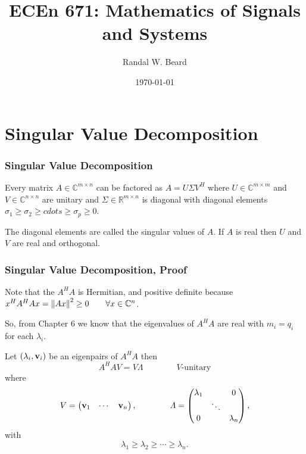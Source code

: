 \documentclass{beamer}
\title{ECEn 671: Mathematics of Signals and Systems}
\author{Randal W. Beard}
\institute{Brigham Young University}
\date{\today}
\begin{document}
\begin{frame}
	\titlepage
\end{frame}

\section{Singular Value Decomposition}
\frame{\sectionpage}


\begin{frame}\frametitle{Singular Value Decomposition}
	\begin{theorem}
		Every matrix $A \in \mathbb{C}^{m\times n}$ can be factored as $A = U\Sigma V^H$ where $U \in \mathbb{C}^{m\times m}$ and $V \in \mathbb{C}^{n\times n}$ are unitary and $\Sigma \in \mathbb{R}^{m\times n}$ is diagonal with diagonal elements $\sigma_1 \geq \sigma_2 \geq cdots \geq \sigma_p \geq 0$.
	\end{theorem}
	
	\vfill
		
	The diagonal elements are called the singular values of $A$.  If $A$ is real then $U$ and $V$ are real and orthogonal.
\end{frame}

\begin{frame}\frametitle{Singular Value Decomposition, Proof}
	Note that the $A^HA$ is Hermitian, and positive definite because $x^HA^HAx = \left\|Ax \right\|^2 \geq 0 \qquad \forall x\in\mathbb{C}^n$.
	
	\vfill
	
	So, from Chapter 6 we know that the eigenvalues of $A^HA$ are real with $m_i = q_i$ for each $\lambda_i$.  
	
	\vfill
	
	Let $(\lambda_i,\mathbf{v}_i)$ be an eigenpairs of $A^HA$ then
	\[ 
		A^HAV = V\Lambda \qquad \qquad V \text{-unitary} 
	\]
	where 
	\[
		V = \begin{pmatrix}
	    		\mathbf{v}_1 & \cdots & \mathbf{v}_n
			\end{pmatrix}, 
		\qquad \qquad
		\Lambda = \begin{pmatrix}
	    			\lambda_1 & & 0\\
	   		 		& \ddots &\\
	    			0 & & \lambda_n
	  			  \end{pmatrix}, 
	  \]
	  with
	  \[
	  	\lambda_1 \geq \lambda_2 \geq \cdots \geq \lambda_n.
	  \]
	
\end{frame}
\end{document}

